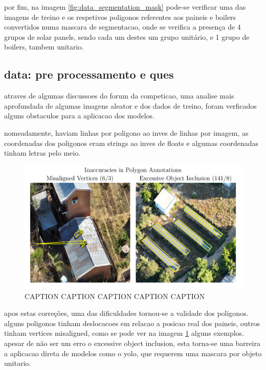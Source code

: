 \documentclass[conference]{IEEEtran}
\begin{document}
por fim, na imagem \ref{fig:data_segmentation_mask} pode-se verificar uma das imagens de treino e os respetivos poligonos referentes aos paineis e boilers convertidos numa mascara de segmentacao, onde se verifica a presença de 4 grupos de solar panels, sendo cada um destes um grupo unitário, e 1 grupo de boilers, tambem unitario.


\subsection{data: pre processamento e ques}

atraves de algumas discussoes do forum da competicao, uma analise mais aprofundada de algumas imagens aleator e dos dados de treino, foram verficados alguns obstaculos para a aplicacao dos modelos.

nomeadamente, haviam linhas por poligono ao inves de linhas por imagem, as coordenadas dos poligonos eram strings ao inves de floats e algumas coordenadas tinham letras pelo meio.

\begin{figure}[H]
    \centering
    \includegraphics[width=1\linewidth]{assets/data_poly_problems.png}
    \caption{CAPTION CAPTION CAPTION CAPTION CAPTION}
    \label{fig:data_poly_problems}
\end{figure}

apos estas correções, uma das dificuldades tornou-se a validade dos poligonos. alguns poligonos tinham deslocacoes em relacao a posicao real dos paineis, outros tinham vertices misaligned, como se pode ver na imagem \ref{fig:data_poly_problems} alguns exemplos. apesar de não ser um erro o excessive object inclusion, esta torna-se uma barreira a aplicacao direta de modelos como o yolo, que requerem uma mascara por objeto unitario.
\end{document}
